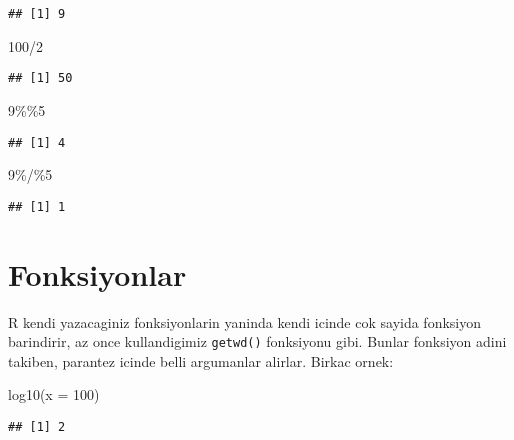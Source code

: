\documentclass[
]{book}
\newenvironment{Shaded}{\begin{snugshade}}{\end{snugshade}}
\newcommand{\AttributeTok}[1]{\textcolor[rgb]{0.77,0.63,0.00}{#1}}
\newcommand{\DecValTok}[1]{\textcolor[rgb]{0.00,0.00,0.81}{#1}}
\newcommand{\FunctionTok}[1]{\textcolor[rgb]{0.00,0.00,0.00}{#1}}
\newcommand{\NormalTok}[1]{#1}
\newcommand{\SpecialCharTok}[1]{\textcolor[rgb]{0.00,0.00,0.00}{#1}}
\begin{document}
\begin{verbatim}
## [1] 9
\end{verbatim}

\begin{Shaded}
\begin{Highlighting}[]
\DecValTok{100}\SpecialCharTok{/}\DecValTok{2}
\end{Highlighting}
\end{Shaded}

\begin{verbatim}
## [1] 50
\end{verbatim}

\begin{Shaded}
\begin{Highlighting}[]
\DecValTok{9}\SpecialCharTok{\%\%}\DecValTok{5}
\end{Highlighting}
\end{Shaded}

\begin{verbatim}
## [1] 4
\end{verbatim}

\begin{Shaded}
\begin{Highlighting}[]
\DecValTok{9}\SpecialCharTok{\%/\%}\DecValTok{5}
\end{Highlighting}
\end{Shaded}

\begin{verbatim}
## [1] 1
\end{verbatim}

\hypertarget{fonksiyonlar}{%
\section{Fonksiyonlar}\label{fonksiyonlar}}

R kendi yazacaginiz fonksiyonlarin yaninda kendi icinde cok sayida fonksiyon barindirir, az once kullandigimiz \texttt{getwd()} fonksiyonu gibi. Bunlar fonksiyon adini takiben, parantez icinde belli argumanlar alirlar. Birkac ornek:

\begin{Shaded}
\begin{Highlighting}[]
\FunctionTok{log10}\NormalTok{(}\AttributeTok{x =} \DecValTok{100}\NormalTok{)}
\end{Highlighting}
\end{Shaded}

\begin{verbatim}
## [1] 2
\end{verbatim}
\end{document}
